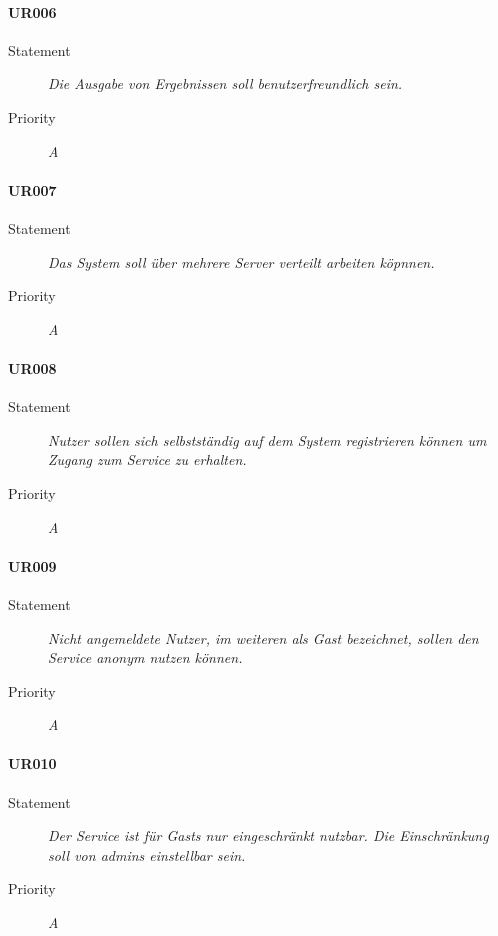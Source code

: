 \paragraph{UR006}
\begin{description}
\item[Statement] \textit{Die Ausgabe von Ergebnissen soll benutzerfreundlich sein.}
\item[Priority] \textit{A}
\end{description}

\paragraph{UR007}
\begin{description}
\item[Statement] \textit{Das System soll über mehrere Server verteilt arbeiten köpnnen.}
\item[Priority] \textit{A}
\end{description}

\paragraph{UR008}
\begin{description}
\item[Statement] \textit{Nutzer sollen sich selbstständig auf dem System registrieren können um Zugang zum Service zu erhalten.}
\item[Priority] \textit{A}
\end{description}

\paragraph{UR009}
\begin{description}
\item[Statement] \textit{Nicht angemeldete Nutzer, im weiteren als \gls{Gast} bezeichnet, sollen den Service anonym nutzen können.}
\item[Priority] \textit{A}
\end{description}

\paragraph{UR010}
\begin{description}
\item[Statement] \textit{Der Service ist für \glspl{Gast} nur eingeschränkt nutzbar. Die Einschränkung soll von \glspl{admin} einstellbar sein.}
\item[Priority] \textit{A}
\end{description}

